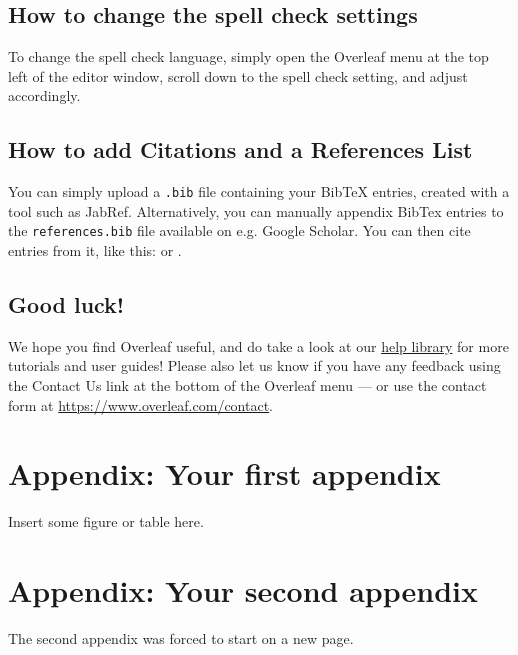 \documentclass[12pt,a4paper,faculty=eb,language=en]{ugent-doc}
\begin{document}
\subsection{How to change the spell check settings}

To change the spell check language, simply open the Overleaf menu at the top left of the editor window, scroll down to the spell check setting, and adjust accordingly.


\subsection{How to add Citations and a References List}

You can simply upload a \texttt{.bib} file containing your BibTeX entries, created with a tool such as JabRef. Alternatively, you can manually appendix BibTex entries to the \texttt{references.bib} file available on e.g. Google Scholar. You can then cite entries from it, like this: \textcite{greenwade93} or \parencite{greenwade93}.


\subsection{Good luck!}

We hope you find Overleaf useful, and do take a look at our \href{https://www.overleaf.com/learn}{help library} for more tutorials and user guides! Please also let us know if you have any feedback using the Contact Us link at the bottom of the Overleaf menu --- or use the contact form at \url{https://www.overleaf.com/contact}.



\printbibliography[heading=bibintoc,title={References}] %


\appendix
\section{Appendix: Your first appendix}
Insert some figure or table here.

\newpage
\section{Appendix: Your second appendix}
The second appendix was forced to start on a new page.
\end{document}
